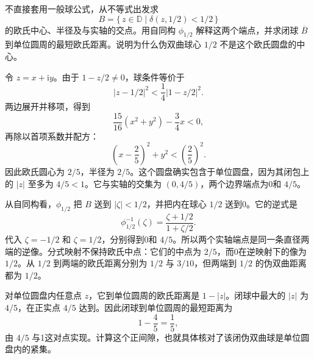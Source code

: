 \begin{exercise}\label{b3:ex:06-2}
不直接套用一般球公式，从不等式出发求
\[
 B=\{\,z\in\mathbb D\mid\delta(z,1/2)<1/2\,\}
\]
的欧氏中心、半径及与实轴的交点。用自同构 \(\phi_{1/2}\) 解释这两个端点，并求闭球 \(\overline B\) 到单位圆周的最短欧氏距离。说明为什么伪双曲球心 \(1/2\) 不是这个欧氏圆盘的中心。
\end{exercise}
\begin{solution}
令 \(z=x+\mathrm{i}y\)。由于 \(1-z/2\ne0\)，球条件等价于
\[
 |z-1/2|^2<\frac14|1-z/2|^2.
\]
两边展开并移项，得到
\[
 \frac{15}{16}(x^2+y^2)-\frac34x<0,
\]
再除以首项系数并配方：
\[
 \left(x-\frac25\right)^2+y^2<\left(\frac25\right)^2.
\]
因此欧氏圆心为 \(2/5\)，半径为 \(2/5\)。这个圆盘确实包含于单位圆盘，因为其闭包上的 \(|z|\) 至多为 \(4/5<1\)。它与实轴的交集为 \((0,4/5)\)，两个边界端点为0和 \(4/5\)。

从自同构看，\(\phi_{1/2}\) 把 \(B\) 送到 \(|\zeta|<1/2\)，并把内在球心 \(1/2\) 送到0。它的逆式是
\[
 \phi_{1/2}^{-1}(\zeta)=\frac{\zeta+1/2}{1+\zeta/2}.
\]
代入 \(\zeta=-1/2\) 和 \(\zeta=1/2\)，分别得到0和 \(4/5\)。所以两个实轴端点是同一条直径两端的逆像。分式映射不保持欧氏中点：它们的中点为 \(2/5\)，而0在逆映射下的像为 \(1/2\)。从 \(1/2\) 到两端的欧氏距离分别为 \(1/2\) 与 \(3/10\)，但两端到 \(1/2\) 的伪双曲距离都为 \(1/2\)。

对单位圆盘内任意点 \(z\)，它到单位圆周的欧氏距离是 \(1-|z|\)。闭球中最大的 \(|z|\) 为 \(4/5\)，在正实点 \(4/5\) 达到。因此闭球到单位圆周的最短距离为
\[
 1-\frac45=\frac15,
\]
由 \(4/5\) 与1这对点实现。计算这个正间隙，也就具体核对了该闭伪双曲球是单位圆盘内的紧集。
\end{solution}

